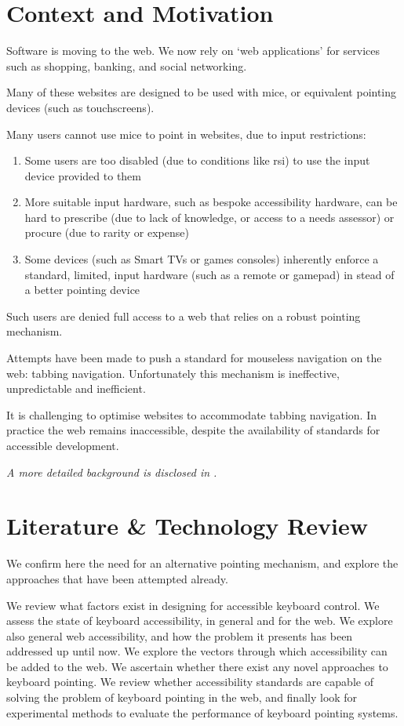 \documentclass[11pt,openright,a4paper]{report}
\begin{document}
\section{Context and Motivation}
Software is moving to the web. We now rely on `web applications' for services such as shopping, banking, and social networking.

Many of these websites are designed to be used with mice, or equivalent pointing devices (such as touchscreens).

Many users cannot use mice to point in websites, due to input restrictions:
\begin{enumerate}
\item Some users are too disabled (due to conditions like \gls{rsi}) to use the input device provided to them
\item More suitable input hardware, such as bespoke accessibility hardware, can be hard to prescribe (due to lack of knowledge, or access to a needs assessor) or procure (due to rarity or expense)
\item Some devices (such as Smart TVs or games consoles) inherently enforce a standard, limited, input hardware (such as a remote or gamepad) in stead of a better pointing device
\end{enumerate}

Such users are denied full access to a web that relies on a robust pointing mechanism.

Attempts have been made to push a standard for mouseless navigation on the web: tabbing navigation. Unfortunately this mechanism is ineffective, unpredictable and inefficient.

It is challenging to optimise websites to accommodate tabbing navigation. In practice the web remains inaccessible, despite the availability of standards for accessible development.

\textit{A more detailed background is disclosed in .}
\section{Literature \& Technology Review}
We confirm here the need for an alternative pointing mechanism, and explore the approaches that have been attempted already.

We review what factors exist in designing for accessible keyboard control. We assess the state of keyboard accessibility, in general and for the web. We explore also general web accessibility, and how the problem it presents has been addressed up until now. We explore the vectors through which accessibility can be added to the web. We ascertain whether there exist any novel approaches to keyboard pointing. We review whether accessibility standards are capable of solving the problem of keyboard pointing in the web, and finally look for experimental methods to evaluate the performance of keyboard pointing systems.
\end{document}

